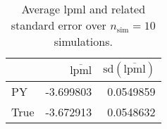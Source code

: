 \begin{table}[H]

\caption{Average lpml and related standard error over $n_{\text{sim}} = 10$ simulations.}
\centering
\begin{tabular}[t]{lrr}
\toprule
  & $\overbar{\text{lpml}}$ & $\text{sd}(\overbar{\text{lpml}})$\\
\midrule
PY & -3.699803 & 0.0549859\\
True & -3.672913 & 0.0548632\\
\bottomrule
\end{tabular}
\end{table}